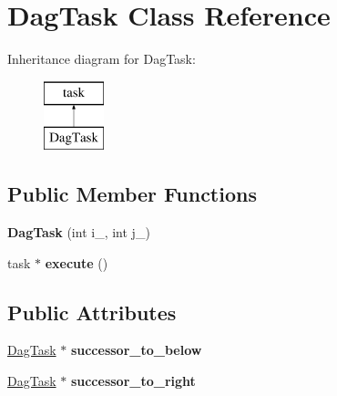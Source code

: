 \hypertarget{classDagTask}{}\section{Dag\+Task Class Reference}
\label{classDagTask}
Inheritance diagram for Dag\+Task\+:\begin{figure}[H]
\begin{center}
\leavevmode
\includegraphics[height=2.000000cm]{classDagTask}
\end{center}
\end{figure}
\subsection*{Public Member Functions}
\begin{DoxyCompactItemize}
\item 
\hypertarget{classDagTask_a5804b120fe54a0d79400e7c0925ed108}{}{\bfseries Dag\+Task} (int i\+\_\+, int j\+\_\+)\label{classDagTask_a5804b120fe54a0d79400e7c0925ed108}

\item 
\hypertarget{classDagTask_a3443093c6f0f7e0afa8934e14d334ab0}{}task $\ast$ {\bfseries execute} ()\label{classDagTask_a3443093c6f0f7e0afa8934e14d334ab0}

\end{DoxyCompactItemize}
\subsection*{Public Attributes}
\begin{DoxyCompactItemize}
\item 
\hypertarget{classDagTask_a608df03cd6f67ffc68ca79b886503415}{}\hyperlink{classDagTask}{Dag\+Task} $\ast$ {\bfseries successor\+\_\+to\+\_\+below}\label{classDagTask_a608df03cd6f67ffc68ca79b886503415}

\item 
\hypertarget{classDagTask_a7d1808d39d7b640c16ae6675d0e9b8d6}{}\hyperlink{classDagTask}{Dag\+Task} $\ast$ {\bfseries successor\+\_\+to\+\_\+right}\label{classDagTask_a7d1808d39d7b640c16ae6675d0e9b8d6}

\end{DoxyCompactItemize}
